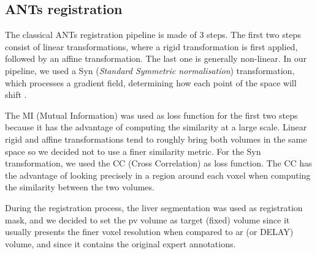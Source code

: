 \subsection{ANTs registration}\label{tcia-db-ants-registration}

The classical ANTs registration pipeline is made of 3 steps. The first
two steps consist of linear transformations, where a rigid
transformation is first applied, followed by an affine transformation.
The last one is generally non-linear. In our pipeline,
we used a Syn (\emph{Standard Symmetric normalisation}) transformation, which
processes a gradient field, determining how each point of the space will
shift \cite{Avants2008}.

The MI (Mutual Information) was used as loss function for the first two
steps because it has the advantage of computing the similarity at a
large scale. Linear rigid and affine transformations tend to roughly bring both volumes
in the same space so we decided not to use a finer similarity metric. For the Syn
transformation, we used the CC (Cross Correlation) as loss function. The CC
has the advantage of looking precisely in a region around each voxel
when computing the similarity between the two volumes.

During the registration process, the liver segmentation was used as
registration mask, and we decided to set the \ac{pv} volume as target (fixed)
volume since it usually presents the finer voxel resolution when
compared to \ac{ar} (or DELAY) volume, and since it contains the original
expert annotations.

\begin{figure}
 \label{regisPipeline}
\end{figure}


